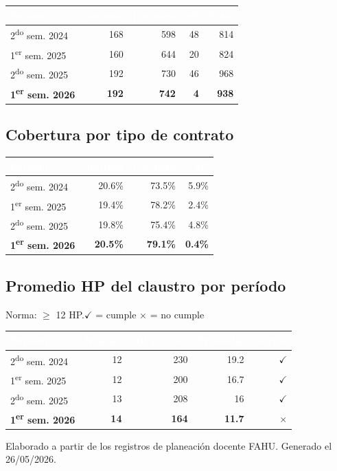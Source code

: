 \documentclass[11pt, a4paper]{article}
\begin{document}
\begin{tabular}{lrrrr}
\toprule
\rowcolor{usachDark} \textbf{\textcolor{white}{Periodo}} & \textbf{\textcolor{white}{Jornada}} & \textbf{\textcolor{white}{Por hora}} & \textbf{\textcolor{white}{SP}} & \textbf{\textcolor{white}{Total}} \\
\midrule
2\textsuperscript{do} sem. 2024 & 168 & 598 & 48 & 814 \\
\rowcolor{rowEven}1\textsuperscript{er} sem. 2025 & 160 & 644 & 20 & 824 \\
2\textsuperscript{do} sem. 2025 & 192 & 730 & 46 & 968 \\
\rowcolor{rowHighlight}\textbf{1\textsuperscript{er} sem. 2026} & \textbf{192} & \textbf{742} & \textbf{4} & \textbf{938} \\
\bottomrule
\end{tabular}

\subsection{Cobertura por tipo de contrato}

\begin{tabular}{lrrr}
\toprule
\rowcolor{usachDark} \textbf{\textcolor{white}{Periodo}} & \textbf{\textcolor{white}{Jornada}} & \textbf{\textcolor{white}{Por hora}} & \textbf{\textcolor{white}{SP}} \\
\midrule
2\textsuperscript{do} sem. 2024 & 20.6\% & 73.5\% & 5.9\% \\
\rowcolor{rowEven}1\textsuperscript{er} sem. 2025 & 19.4\% & 78.2\% & 2.4\% \\
2\textsuperscript{do} sem. 2025 & 19.8\% & 75.4\% & 4.8\% \\
\rowcolor{rowHighlight}\textbf{1\textsuperscript{er} sem. 2026} & \textbf{20.5\%} & \textbf{79.1\%} & \textbf{0.4\%} \\
\bottomrule
\end{tabular}

\subsection{Promedio HP del claustro por período}

Norma: $\geq$ 12 HP.\quad$\checkmark$ = cumple \quad $\times$ = no cumple

\begin{tabular}{lrrrr}
\toprule
\rowcolor{usachDark} \textbf{\textcolor{white}{Periodo}} & \textbf{\textcolor{white}{N acad.}} & \textbf{\textcolor{white}{HP jornada}} & \textbf{\textcolor{white}{Promedio}} & \textbf{\textcolor{white}{Norma}} \\
\midrule
2\textsuperscript{do} sem. 2024 & 12 & 230 & 19.2 & $\checkmark$ \\
\rowcolor{rowEven}1\textsuperscript{er} sem. 2025 & 12 & 200 & 16.7 & $\checkmark$ \\
2\textsuperscript{do} sem. 2025 & 13 & 208 & 16 & $\checkmark$ \\
\rowcolor{rowHighlight}\textbf{1\textsuperscript{er} sem. 2026} & \textbf{14} & \textbf{164} & \textbf{11.7} & \textbf{$\times$} \\
\bottomrule
\end{tabular}

\vfill
{\footnotesize\color{gray} Elaborado a partir de los registros de planeación docente FAHU. Generado el 26/05/2026.}
\end{document}

